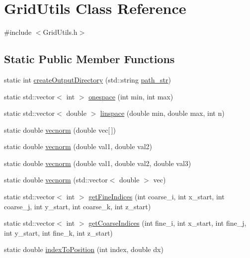 \hypertarget{class_grid_utils}{}\section{Grid\+Utils Class Reference}
\label{class_grid_utils}


{\ttfamily \#include $<$Grid\+Utils.\+h$>$}

\subsection*{Static Public Member Functions}
\begin{DoxyCompactItemize}
\item 
static int \hyperlink{class_grid_utils_ae2c829e8787d4aa03ec961dc84213b0d}{create\+Output\+Directory} (std\+::string \hyperlink{class_grid_utils_a9b58748e9e05e84852962d7abc7942e3}{path\+\_\+str})
\item 
static std\+::vector$<$ int $>$ \hyperlink{class_grid_utils_a1f0d4a76be76a743c368c9a1d4d46cbc}{onespace} (int min, int max)
\item 
static std\+::vector$<$ double $>$ \hyperlink{class_grid_utils_a2f172a6dd8b2749ca1c8336a64a07e29}{linspace} (double min, double max, int n)
\item 
static double \hyperlink{class_grid_utils_ab51d52eb381ac0b27e3522e101922428}{vecnorm} (double vec\mbox{[}$\,$\mbox{]})
\item 
static double \hyperlink{class_grid_utils_ae7d797edf50b3c3a448d59684a135aee}{vecnorm} (double val1, double val2)
\item 
static double \hyperlink{class_grid_utils_a6caced99b15b01746c1fb5828c447034}{vecnorm} (double val1, double val2, double val3)
\item 
static double \hyperlink{class_grid_utils_a45167f9bde2e34d868a4ccc64f588ab2}{vecnorm} (std\+::vector$<$ double $>$ vec)
\item 
static std\+::vector$<$ int $>$ \hyperlink{class_grid_utils_aee47fe58eccee5fffd67bb489fd1c315}{get\+Fine\+Indices} (int coarse\+\_\+i, int x\+\_\+start, int coarse\+\_\+j, int y\+\_\+start, int coarse\+\_\+k, int z\+\_\+start)
\item 
static std\+::vector$<$ int $>$ \hyperlink{class_grid_utils_a4d3973d2b60fe6cac6e49e8640307958}{get\+Coarse\+Indices} (int fine\+\_\+i, int x\+\_\+start, int fine\+\_\+j, int y\+\_\+start, int fine\+\_\+k, int z\+\_\+start)
\item 
static double \hyperlink{class_grid_utils_a47d5c12d681b275441029744febbb520}{index\+To\+Position} (int index, double dx)

\end{DoxyCompactItemize}
